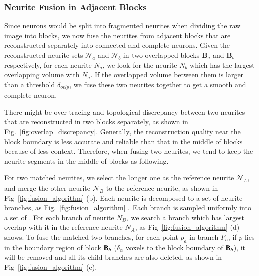 \subsubsection{Neurite Fusion in Adjacent Blocks}
\label{sec:fusion}

Since neurons would be split into fragmented neurites when dividing the raw image into blocks, we now fuse the neurites from adjacent blocks that are reconstructed separately into connected and complete neurons.
Given the reconstructed neurite sets $\mathcal{N}_a$ and $\mathcal{N}_b$ in two overlapped blocks $\mathbf{B}_a$ and $\mathbf{B}_b$ respectively, for each neurite ${N}_{a}$, we look for the neurite ${N}_{b}$ which has the largest overlapping volume with ${N}_{a}$. If the overlapped volume between them is larger than a threshold $\delta_{ovlp}$, we fuse these two neurites together to get a smooth and complete neuron.
 
There might be over-tracing and topological discrepancy between two neurites that are reconstructed in two blocks separately, as shown in Fig.~\ref{fig:overlap_discrepancy}.
Generally, the reconstruction quality near the block boundary is less accurate and reliable than that in the middle of blocks because of less context. 
Therefore, when fusing two neurites, we tend to keep the neurite segments in the middle of blocks as following. 
  
For two matched neurites, we select the longer one as the reference neurite $\mathcal{N}_A$, and merge the other neurite $\mathcal{N}_B$ to the reference neurite, as shown in Fig~\ref{fig:fusion_algorithm} (b).
%
Each neurite is decomposed to a set of neurite branches, as Fig.~\ref{fig:fusion_algorithm} .
Each branch is sampled uniformly into a set of .
%
For each branch of neurite $N_B$, we search a branch which has largest overlap with it in the reference neurite $N_A$, as Fig~\ref{fig:fusion_algorithm} (d) shows.
To fuse the matched two branches, for each point $p_a$ in branch $F_a$, if $p$ lies in the boundary region of block $\mathbf{B}_b$ ($\delta_{\alpha}$ voxels to the block boundary of $\mathbf{B}_b$), it will be removed and all its child branches are also deleted, as shown in Fig~\ref{fig:fusion_algorithm} (e). 


